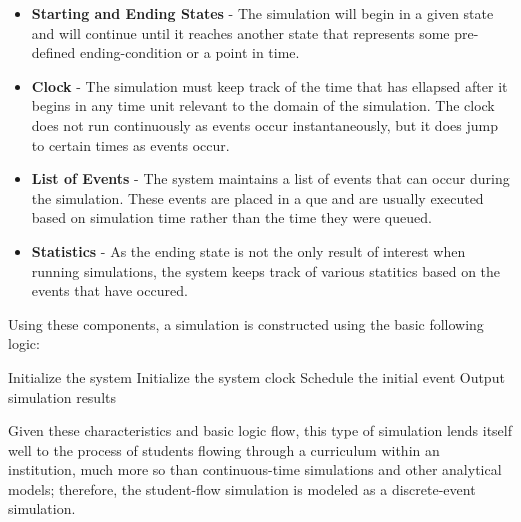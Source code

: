 \documentclass[botnum, fleqn]{unmeethesis}
\begin{document}
\begin{itemize}
\item \textbf{Starting and Ending States} - The simulation will begin in a given state and will continue until it reaches another state that represents some pre-defined ending-condition or a point in time.
\item \textbf{Clock} - The simulation must keep track of the time that has ellapsed after it begins in any time unit relevant to the domain of the simulation. The clock does not run continuously as events occur instantaneously, but it does jump to certain times as events occur.
\item \textbf{List of Events} - The system maintains a list of events that can occur during the simulation. These events are placed in a que and are usually executed based on simulation time rather than the time they were queued.
\item \textbf{Statistics} - As the ending state is not the only result of interest when running simulations, the system keeps track of various statitics based on the events that have occured.
\end{itemize}

Using these components, a simulation is constructed using the basic following logic:

\begin{algorithmic}[1]
\STATE Initialize the system
\STATE Initialize the system clock
\STATE Schedule the initial event
\ENDWHILE
\STATE Output simulation results
\end{algorithmic}

Given these characteristics and basic logic flow, this type of simulation lends itself well to the process of students flowing through a curriculum within an institution, much more so than continuous-time simulations and other analytical models; therefore, the student-flow simulation is modeled as a discrete-event simulation.
\end{document}

